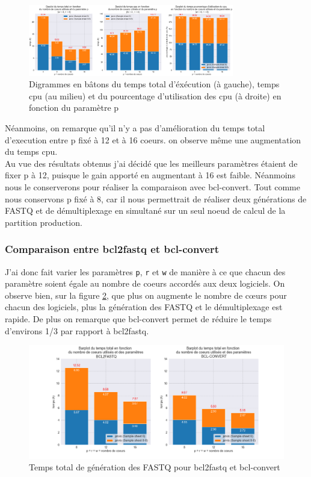 \begin{figure}[H]
    \centering
    \includegraphics[width=0.8\textwidth]{img/barplot_cum_jarvis1.png}
    \caption{\footnotesize{Digrammes en bâtons du temps total d'éxécution (à gauche), temps cpu (au milieu) et du pourcentage d'utilisation des cpu (à droite) en fonction du paramètre p}}
    \label{barplot-param2}
\end{figure}

Néanmoins, on remarque qu'il n'y a pas d'amélioration du temps total d'execution entre p fixé à 12 et à 16 coeurs. on observe même une augmentation du temps cpu.\\

Au vue des résultats obtenus j'ai décidé que les meilleurs paramètres étaient de fixer p à 12, puisque le gain apporté en augmentant à 16 est faible. Néanmoins nous le conserverons pour réaliser la comparaison avec bcl-convert.
Tout comme nous conservons p fixé à 8, car il nous permettrait de réaliser deux générations de FASTQ et de démultiplexage en simultané sur un seul noeud de calcul de la partition \og production\fg{}.\\

\subsubsection{Comparaison entre bcl2fastq et bcl-convert}
J'ai donc fait varier les paramètres \texttt{p}, \texttt{r} et \texttt{w} de manière à ce que chacun des paramètre soient égale au nombre de coeurs accordés aux deux logiciels. On observe bien, sur la figure \ref{fig-total-time}, que plus on augmente le nombre de cœurs pour chacun des logiciels, plus la génération des FASTQ et le démultiplexage est rapide. De plus on remarque que bcl-convert permet de réduire le temps d'environs 1/3 par rapport à bcl2fastq. 

\begin{figure}[H]
    \centering
    \includegraphics[width=1\textwidth]{img/barplot_total_time_comp.png}
    \caption{\footnotesize{Temps total de génération des FASTQ pour bcl2fastq et bcl-convert}}
    \label{fig-total-time}
\end{figure}

